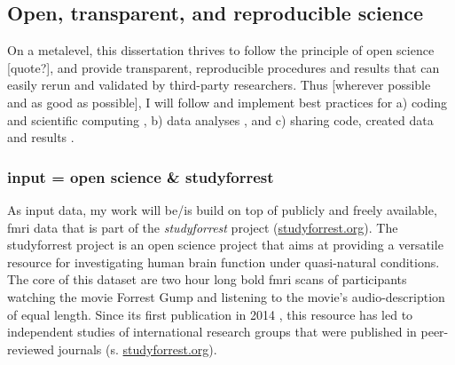 \subsection{Open, transparent, and reproducible science}
%
%
%
%
On a metalevel, this dissertation thrives to follow the principle of open
science [quote?], and provide transparent, reproducible procedures and results
\citep{poldrack2017scanning} that can easily rerun and validated by third-party
researchers.
Thus [wherever possible and as good as possible], I will follow and implement
best practices for a) coding and scientific computing \citep{wilson2014best}, b)
data analyses \citep{nichols2017best}, and c) sharing code, created data and
results \citep{eglen2017toward, nichols2017best}.


\subsubsection{input = open science \& studyforrest}


As input data, my work will be/is build on top of publicly and freely available,
\ac{fmri} data that is part of the \textit{studyforrest} project
(\href{www.studyforrest.org}{studyforrest.org}).
%
The studyforrest project is an open science project that aims at providing a
versatile resource for investigating human brain function under quasi-natural
conditions.
%
The core of this dataset are two hour long \ac{bold} \ac{fmri} scans of
participants watching the movie Forrest Gump and listening to the movie's
audio-description of equal length.
%
Since its first publication in 2014 \citep{hanke2014audiomovie}, this resource
has led to independent studies of international research groups that were
published in peer-reviewed journals (s.
\href{www.studyforrest.org}{studyforrest.org}).

